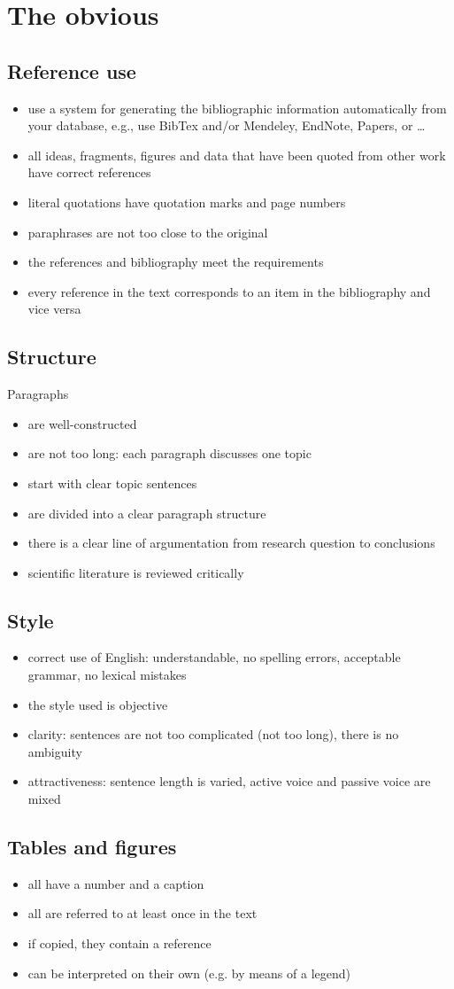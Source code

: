 \appendix
\section{The obvious}
\subsection{Reference use}
\begin{itemize}
\item use a system for generating the bibliographic information automatically from your database, e.g., use BibTex and/or Mendeley, EndNote, Papers, or \ldots
\item all ideas, fragments, figures and data that have been quoted from other work have correct references
\item literal quotations have quotation marks and page numbers
\item paraphrases are not too close to the original
\item the references and bibliography meet the requirements
\item every reference in the text corresponds to an item in the bibliography and vice versa
\end{itemize}

\subsection{Structure}
Paragraphs
\begin{itemize}
\item are well-constructed
\item are not too long: each paragraph discusses one topic
\item start with clear topic sentences
\item are divided into a clear paragraph structure
\item there is a clear line of argumentation from research question to conclusions
\item scientific literature is reviewed critically
\end{itemize}

\subsection{Style}
\begin{itemize}
\item correct use of English: understandable, no spelling errors, acceptable grammar, no lexical mistakes 
\item the style used is objective
\item clarity: sentences are not too complicated (not too long), there is no ambiguity
\item attractiveness: sentence length is varied, active voice and passive voice are mixed
\end{itemize}

\subsection{Tables and figures}
\begin{itemize}
\item all have a number and a caption
\item all are referred to at least once in the text
\item if copied, they contain a reference
\item can be interpreted on their own (e.g. by means of a legend)
\end{itemize}